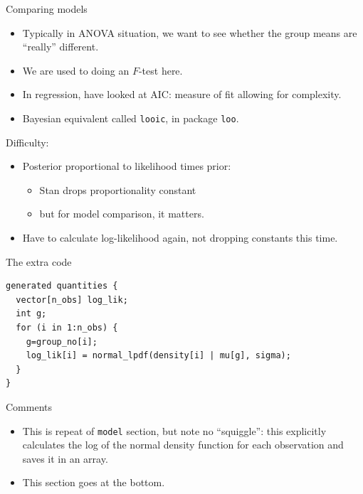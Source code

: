 \documentclass[
  ignorenonframetext,
]{beamer}
\providecommand{\tightlist}{%
  \setlength{\itemsep}{0pt}\setlength{\parskip}{0pt}}
\begin{document}
\begin{frame}[fragile]{Comparing models}
\protect\hypertarget{comparing-models}{}

\begin{itemize}
\tightlist
\item
  Typically in ANOVA situation, we want to see whether the group means
  are ``really'' different.
\item
  We are used to doing an \(F\)-test here.
\item
  In regression, have looked at AIC: measure of fit allowing for
  complexity.
\item
  Bayesian equivalent called \texttt{looic}, in package \texttt{loo}.
\end{itemize}

\end{frame}

\begin{frame}{Difficulty:}
\protect\hypertarget{difficulty}{}

\begin{itemize}
\tightlist
\item
  Posterior proportional to likelihood times prior:

  \begin{itemize}
  \tightlist
  \item
    Stan drops proportionality constant
  \item
    but for model comparison, it matters.
  \end{itemize}
\item
  Have to calculate log-likelihood again, not dropping constants this
  time.
\end{itemize}

\end{frame}

\begin{frame}[fragile]{The extra code}
\protect\hypertarget{the-extra-code}{}

\begin{verbatim}
generated quantities {
  vector[n_obs] log_lik;
  int g;
  for (i in 1:n_obs) {
    g=group_no[i];
    log_lik[i] = normal_lpdf(density[i] | mu[g], sigma);
  }
}
\end{verbatim}

\end{frame}

\begin{frame}[fragile]{Comments}
\protect\hypertarget{comments-32}{}

\begin{itemize}
\tightlist
\item
  This is repeat of \texttt{model} section, but note no ``squiggle'':
  this explicitly calculates the log of the normal density function for
  each observation and saves it in an array.
\item
  This section goes at the bottom.
\end{itemize}

\end{frame}
\end{document}
